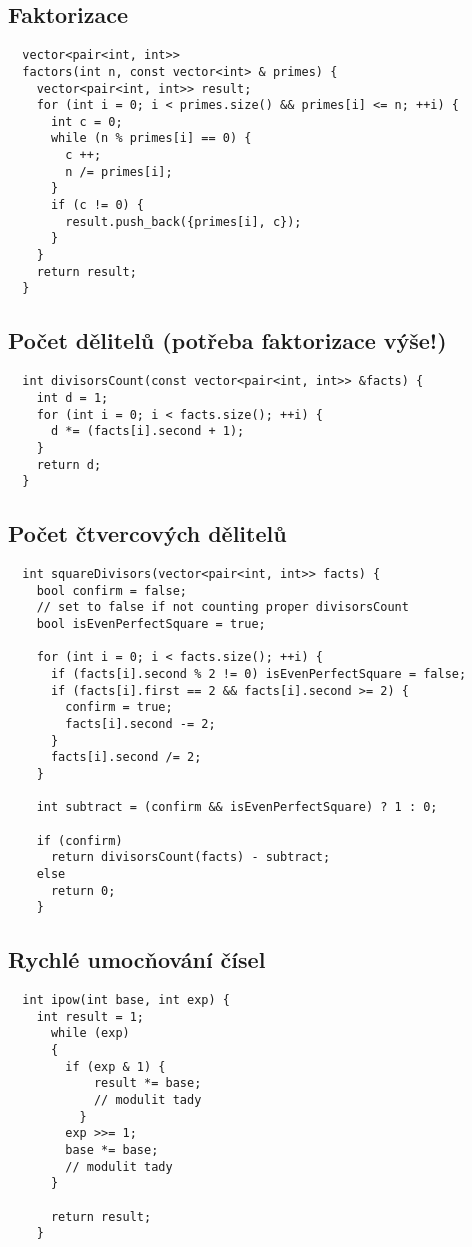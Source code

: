 \documentclass{article}
\begin{document}
\subsection{Faktorizace}
\begin{lstlisting}
  vector<pair<int, int>> 
  factors(int n, const vector<int> & primes) {
    vector<pair<int, int>> result;
    for (int i = 0; i < primes.size() && primes[i] <= n; ++i) {
      int c = 0;
      while (n % primes[i] == 0) {
        c ++;
        n /= primes[i];
      }
      if (c != 0) {
        result.push_back({primes[i], c});
      }
    }
    return result;
  }
\end{lstlisting}

\subsection{Počet dělitelů (potřeba faktorizace výše!)}
\begin{lstlisting}
  int divisorsCount(const vector<pair<int, int>> &facts) {
    int d = 1;
    for (int i = 0; i < facts.size(); ++i) {
      d *= (facts[i].second + 1);
    }
    return d;
  }
\end{lstlisting}

\subsection{Počet čtvercových dělitelů}
\begin{lstlisting}
  int squareDivisors(vector<pair<int, int>> facts) {
    bool confirm = false;
    // set to false if not counting proper divisorsCount
    bool isEvenPerfectSquare = true;

    for (int i = 0; i < facts.size(); ++i) {
      if (facts[i].second % 2 != 0) isEvenPerfectSquare = false;
      if (facts[i].first == 2 && facts[i].second >= 2) {
        confirm = true;
        facts[i].second -= 2;
      }
      facts[i].second /= 2;
    }

    int subtract = (confirm && isEvenPerfectSquare) ? 1 : 0;

    if (confirm)
      return divisorsCount(facts) - subtract;
    else
      return 0;
    }
\end{lstlisting}

\subsection{Rychlé umocňování čísel}
\begin{lstlisting}
  int ipow(int base, int exp) {
    int result = 1;
      while (exp)
      {
        if (exp & 1) {
            result *= base;
            // modulit tady
          }
        exp >>= 1;
        base *= base;
        // modulit tady
      }

      return result;
    }
\end{lstlisting}
\end{document}
